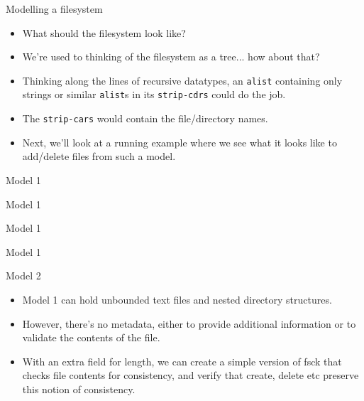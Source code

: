 \documentclass{beamer}
\begin{document}
\begin{frame}{Modelling a filesystem}
  \begin{itemize}
  \item What should the filesystem look like?
  \item We're used to thinking of the filesystem as a tree... how
    about that?
  \item Thinking along the lines of recursive datatypes, an \texttt{alist}
    containing only strings or similar \texttt{alist}s in its
    \texttt{strip-cdrs} could do the job.
  \item The \texttt{strip-cars} would contain the file/directory
    names.
  \item Next, we'll look at a running example where we see what it
    looks like to add/delete files from such a model.
  \end{itemize}
\end{frame}

\begin{frame}{Model 1}
  \begin{figure}
    \centering
    \def\svgwidth{\columnwidth}
    
  \end{figure}
\end{frame}

\begin{frame}{Model 1}
  \begin{figure}
    \centering
    \def\svgwidth{\columnwidth}
    
  \end{figure}
\end{frame}

\begin{frame}{Model 1}
  \begin{figure}
    \centering
    \def\svgwidth{\columnwidth}
    
  \end{figure}
\end{frame}

\begin{frame}{Model 1}
  \begin{figure}
    \centering
    \def\svgwidth{\columnwidth}
    
  \end{figure}
\end{frame}

\begin{frame}{Model 2}
  \begin{itemize}
  \item Model 1 can hold unbounded text files and nested directory
    structures.
    \item However, there's no metadata, either to provide additional
      information or to validate the contents of the file.
    \item With an extra field for length, we can create a simple
      version of fsck that checks file contents for consistency, and
      verify that create, delete etc preserve this notion of
      consistency.
  \end{itemize}
\end{frame}
\end{document}
